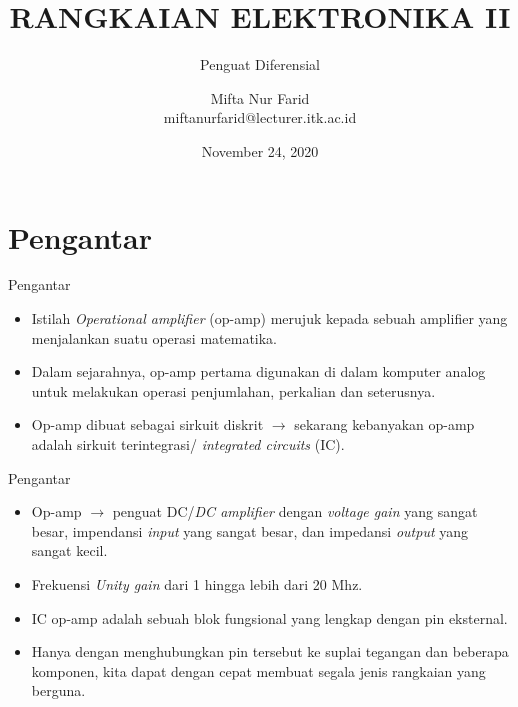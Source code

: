 \documentclass[aspectratio=169]{beamer}
\author{Mifta Nur Farid \\
	miftanurfarid@lecturer.itk.ac.id}
\title{RANGKAIAN ELEKTRONIKA II}
\subtitle{Penguat Diferensial}
\institute{Teknik Elektro \\ Institut Teknologi Kalimantan \\ Balikpapan, Indonesia}
\date{\tiny November 24, 2020}
\begin{document}
\begin{frame}[t,plain]
\titlepage
\end{frame}


\section{Pengantar}
\begin{frame}{Pengantar}
	\begin{itemize}
		\item Istilah \textit{Operational amplifier} (op-amp) merujuk kepada sebuah amplifier yang menjalankan suatu operasi matematika.
		\item Dalam sejarahnya, op-amp pertama digunakan di dalam komputer analog untuk melakukan operasi penjumlahan, perkalian dan seterusnya.
		\item Op-amp dibuat sebagai sirkuit diskrit $ \rightarrow $ sekarang kebanyakan op-amp adalah sirkuit terintegrasi/ \textit{integrated circuits} (IC). 
	\end{itemize}
\end{frame}
	
\begin{frame}{Pengantar}
	\begin{itemize}
		\item Op-amp $ \rightarrow $ penguat DC/\textit{DC amplifier} dengan \textit{voltage gain} yang sangat besar, impendansi \textit{input} yang sangat besar, dan impedansi \textit{output} yang sangat kecil.
		\item Frekuensi \textit{Unity gain} dari 1 hingga lebih dari 20 Mhz.
		\item IC op-amp adalah sebuah blok fungsional yang lengkap dengan pin eksternal.
		\item Hanya dengan menghubungkan pin tersebut ke suplai tegangan dan beberapa komponen, kita dapat dengan cepat membuat segala jenis rangkaian yang berguna.
	\end{itemize}
\end{frame}
\end{document}
